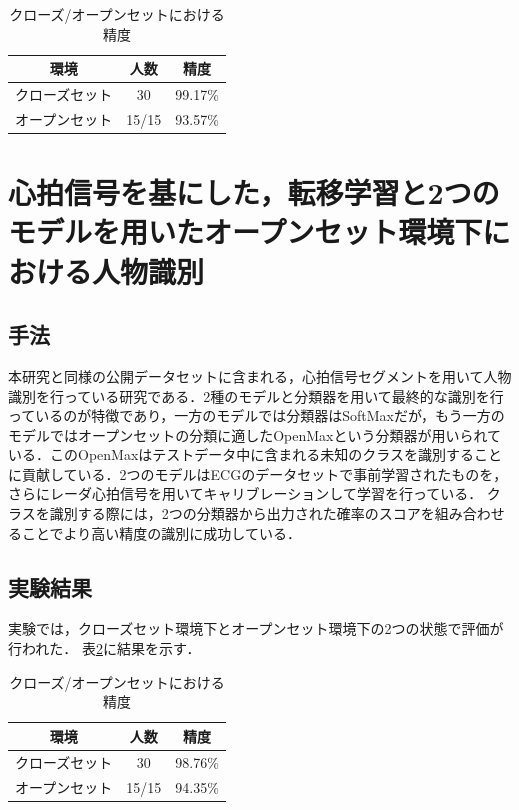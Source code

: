 \begin{table}[H]
\caption{クローズ/オープンセットにおける精度}
\centering
\begin{tabular}{ccc}
\hline
環境 & 人数 & 精度 \\
\hline
クローズセット & 30 & 99.17\% \\
オープンセット & 15/15 & 93.57\% \\
\hline
\end{tabular}
\label{table:HeartSignature}
\end{table}

\section{心拍信号を基にした，転移学習と2つのモデルを用いたオープンセット環境下における人物識別\cite{paper:Xing}}
\subsection{手法}
本研究と同様の公開データセットに含まれる，心拍信号セグメントを用いて人物識別を行っている研究である．2種のモデルと分類器を用いて最終的な識別を行っているのが特徴であり，一方のモデルでは分類器はSoftMaxだが，もう一方のモデルではオープンセットの分類に適したOpenMax\cite{}という分類器が用いられている．このOpenMaxはテストデータ中に含まれる未知のクラスを識別することに貢献している．2つのモデルはECGのデータセットで事前学習されたものを，さらにレーダ心拍信号を用いてキャリブレーションして学習を行っている．
クラスを識別する際には，2つの分類器から出力された確率のスコアを組み合わせることでより高い精度の識別に成功している．

\subsection{実験結果}
実験では，クローズセット環境下とオープンセット環境下の2つの状態で評価が行われた．
表\ref{table:Xing}に結果を示す．

\begin{table}[H]
\caption{クローズ/オープンセットにおける精度}
\centering
\begin{tabular}{ccc}
\hline
環境 & 人数 & 精度 \\
\hline
クローズセット & 30 & 98.76\% \\
オープンセット & 15/15 & 94.35\% \\
\hline
\end{tabular}
\label{table:Xing}
\end{table}



